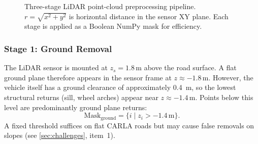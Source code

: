 \documentclass[12pt,a4paper]{article}
\begin{document}
\begin{figure}[H]
\centering
{}
\caption{Three-stage LiDAR point-cloud preprocessing pipeline.
  $r = \sqrt{x^2+y^2}$ is horizontal distance in the sensor XY plane.
  Each stage is applied as a Boolean NumPy mask for efficiency.}
\label{fig:lidar_pipeline}
\end{figure}

\subsubsection{Stage 1: Ground Removal}

The LiDAR sensor is mounted at $z_s = 1.8$\,m above the road surface.  A
flat ground plane therefore appears in the sensor frame at $z \approx -1.8$\,m.
However, the vehicle itself has a ground clearance of approximately
\SI{0.4}{\metre}, so the lowest structural returns (sill, wheel arches) appear
near $z \approx -1.4$\,m.  Points below this level are predominantly ground
plane returns:
\begin{equation}
  \text{Mask}_{\text{ground}} = \bigl\{ i \;\big|\; z_i > -1.4\,\text{m} \bigr\}.
  \label{eq:ground_mask}
\end{equation}
A fixed threshold suffices on flat CARLA roads but may cause false removals on
slopes (see \cref{sec:challenges}, item~1).
\end{document}
